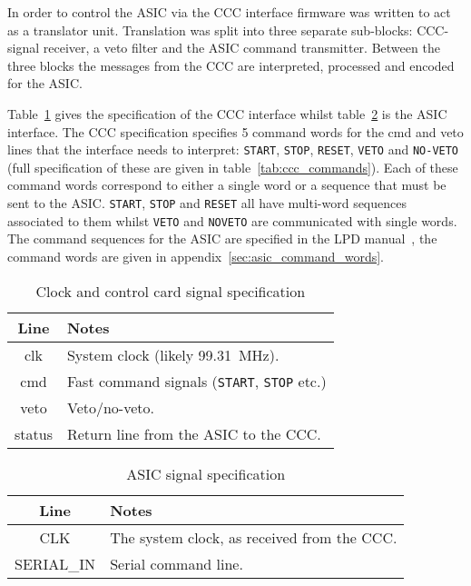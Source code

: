 \documentclass[]{article}
\begin{document}
    In order to control the ASIC via the CCC interface firmware was written to act as a translator unit. Translation was split into three separate sub-blocks: CCC-signal receiver, a veto filter and the ASIC command transmitter. Between the three blocks the messages from the CCC are interpreted, processed and encoded for the ASIC. 
    
    Table~\ref{tab:ccc_spec} gives the specification of the CCC interface whilst table~\ref{tab:asic_spec} is the ASIC interface. The CCC specification specifies 5 command words for the cmd and veto lines that the interface needs to interpret: \texttt{START}, \texttt{STOP}, \texttt{RESET}, \texttt{VETO} and \texttt{NO-VETO} (full specification of these are given in table~\ref{tab:ccc_commands}). Each of these command words correspond to either a single word or a sequence that must be sent to the ASIC. \texttt{START}, \texttt{STOP} and \texttt{RESET} all have multi-word sequences associated to them whilst \texttt{VETO} and \texttt{NOVETO} are communicated with single words. The command sequences for the ASIC are specified in the LPD manual~\cite{LPD MANUAL}, the command words are given in appendix~\ref{sec:asic_command_words}.
    
    \begin{table}
        \begin{center}
            \begin{tabular}{c|l}
                Line & Notes \\
                \hline
                clk    & System clock (likely 99.31~MHz).        \\
                cmd    & Fast command signals (\texttt{START}, \texttt{STOP} etc.) \\
                veto   & Veto/no-veto.                                             \\
                status & Return line from the ASIC to the CCC.                     \\
            \end{tabular}
        \end{center}
        \caption{Clock and control card signal specification}
        \label{tab:ccc_spec}
    \end{table}

    \begin{table}
        \begin{center}
            \begin{tabular}{c|l}
                Line       & Notes                                       \\
                \hline
                CLK        & The system clock, as received from the CCC. \\
                SERIAL\_IN & Serial command line.                        \\
            \end{tabular}
        \end{center}
        \caption{ASIC signal specification}
        \label{tab:asic_spec}
    \end{table}
  
\end{document}
